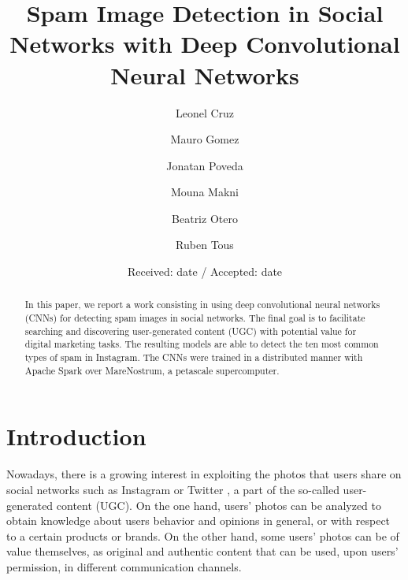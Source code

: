 \documentclass[smallextended]{svjour3}       %
\begin{document}
\title{Spam Image Detection in Social Networks with Deep Convolutional Neural Networks}


\author{Leonel Cruz \and
        Mauro Gomez \and
        Jonatan Poveda \and
        Mouna Makni \and
        Beatriz Otero \and
        Ruben Tous 
}



\date{Received: date / Accepted: date}


\maketitle

\begin{abstract}
In this paper, we report a work consisting in using deep convolutional neural networks (CNNs) for detecting spam images in social networks. The final goal is to facilitate searching and discovering user-generated content (UGC) with potential value for digital marketing tasks. The resulting models are able to detect the ten most common types of spam in Instagram. The CNNs were trained in a distributed manner with Apache Spark over MareNostrum, a petascale supercomputer. 
\end{abstract}

\section{Introduction}
\label{intro}
Nowadays, there is a growing interest in exploiting the photos that users share on social networks such as Instagram or Twitter \cite{conf/bigdataconf/Tous16}, a part of the so-called user-generated content (UGC). On the one hand, users' photos can be analyzed to obtain knowledge about users behavior and opinions in general, or with respect to a certain products or brands. On the other hand, some users' photos can be of value themselves, as original and authentic content that can be used, upon users' permission, in different communication channels. 
\end{document}
